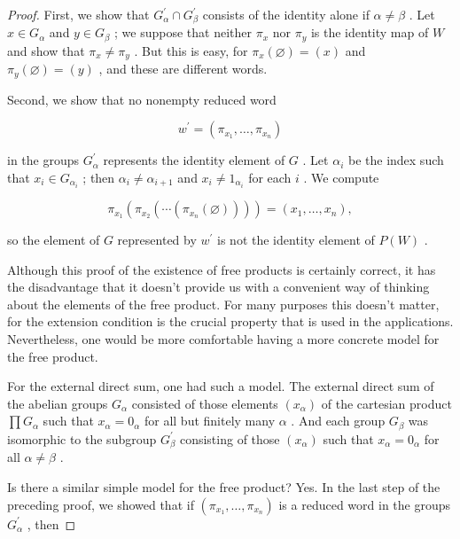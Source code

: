 \begin{proof}
First, we show that \({G}_{\alpha }^{\prime } \cap  {G}_{\beta }^{\prime }\) consists of the identity alone if \(\alpha  \neq  \beta\) . Let \(x \in  {G}_{\alpha }\) and \(y \in  {G}_{\beta }\) ; we suppose that neither \({\pi }_{x}\) nor \({\pi }_{y}\) is the identity map of \(W\) and show that \({\pi }_{x} \neq  {\pi }_{y}\) . But this is easy, for \({\pi }_{x}\left( \varnothing \right)  = \left( x\right)\) and \({\pi }_{y}\left( \varnothing \right)  = \left( y\right)\) , and these are different words.

Second, we show that no nonempty reduced word

\[
{w}^{\prime } = \left( {{\pi }_{{x}_{1}},\ldots ,{\pi }_{{x}_{n}}}\right)
\]

in the groups \({G}_{\alpha }^{\prime }\) represents the identity element of \(G\) . Let \({\alpha }_{i}\) be the index such that \({x}_{i} \in  {G}_{{\alpha }_{i}}\) ; then \({\alpha }_{i} \neq  {\alpha }_{i + 1}\) and \({x}_{i} \neq  {1}_{{\alpha }_{i}}\) for each \(i\) . We compute

\[
{\pi }_{{x}_{1}}\left( {{\pi }_{{x}_{2}}\left( {\cdots \left( {{\pi }_{{x}_{n}}\left( \varnothing \right) }\right) }\right) }\right)  = \left( {{x}_{1},\ldots ,{x}_{n}}\right) ,
\]

so the element of \(G\) represented by \({w}^{\prime }\) is not the identity element of \(P\left( W\right)\) .

Although this proof of the existence of free products is certainly correct, it has the disadvantage that it doesn't provide us with a convenient way of thinking about the elements of the free product. For many purposes this doesn't matter, for the extension condition is the crucial property that is used in the applications. Nevertheless, one would be more comfortable having a more concrete model for the free product.

For the external direct sum, one had such a model. The external direct sum of the abelian groups \({G}_{\alpha }\) consisted of those elements \(\left( {x}_{\alpha }\right)\) of the cartesian product \(\prod {G}_{\alpha }\) such that \({x}_{\alpha } = {0}_{\alpha }\) for all but finitely many \(\alpha\) . And each group \({G}_{\beta }\) was isomorphic to the subgroup \({G}_{\beta }^{\prime }\) consisting of those \(\left( {x}_{\alpha }\right)\) such that \({x}_{\alpha } = {0}_{\alpha }\) for all \(\alpha  \neq  \beta\) .

Is there a similar simple model for the free product? Yes. In the last step of the preceding proof, we showed that if \(\left( {{\pi }_{{x}_{1}},\ldots ,{\pi }_{{x}_{n}}}\right)\) is a reduced word in the groups \({G}_{\alpha }^{\prime }\) , then


\end{proof}
